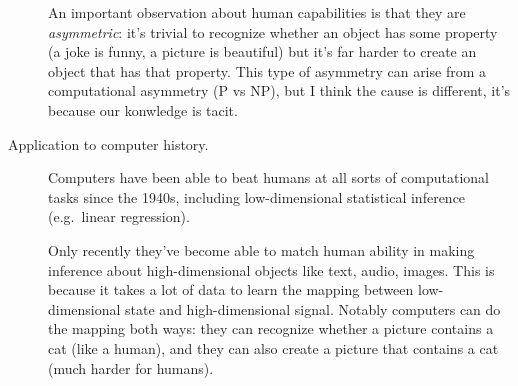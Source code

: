 \documentclass[
  10pt,
  letterpaper,
  DIV=11,
  numbers=noendperiod,
  oneside]{scrartcl}
\begin{document}
\begin{description}
An important observation about human capabilities is that they are
\emph{asymmetric}: it's trivial to recognize whether an object has some
property (a joke is funny, a picture is beautiful) but it's far harder
to create an object that has that property. This type of asymmetry can
arise from a computational asymmetry (P vs NP), but I think the cause is
different, it's because our konwledge is tacit.
\item[Application to computer history.]
Computers have been able to beat humans at all sorts of computational
tasks since the 1940s, including low-dimensional statistical inference
(e.g.~linear regression).

Only recently they've become able to match human ability in making
inference about high-dimensional objects like text, audio, images. This
is because it takes a lot of data to learn the mapping between
low-dimensional state and high-dimensional signal. Notably computers can
do the mapping both ways: they can recognize whether a picture contains
a cat (like a human), and they can also create a picture that contains a
cat (much harder for humans).
\end{description}
\end{document}
